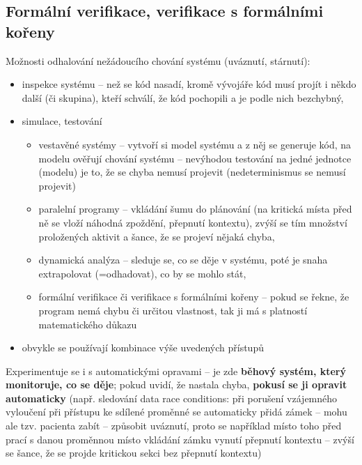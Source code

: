 \documentclass[a4paper, 11pt]{article}
\begin{document}
\subsection{Formální verifikace, verifikace s formálními kořeny}
Možnosti odhalování nežádoucího chování systému (uváznutí, stárnutí):
\begin{itemize}
    \item inspekce systému -- než se kód nasadí, kromě vývojáře kód musí projít i někdo další (či skupina), kteří schválí, že kód pochopili a je podle nich bezchybný,
    \item simulace, testování
    \begin{itemize}
        \item vestavěné systémy -- vytvoří si model systému a z něj se generuje kód, na modelu ověřují chování systému -- nevýhodou testování na jedné jednotce (modelu) je to, že se chyba nemusí projevit (nedeterminismus se nemusí projevit)
        
        \item paralelní programy -- vkládání šumu do plánování (na kritická místa před ně se vloží náhodná zpoždění, přepnutí kontextu), zvýší se tím množství proložených aktivit a šance, že se projeví nějaká chyba,
        
        \item dynamická analýza -- sleduje se, co se děje v systému, poté je snaha extrapolovat (=odhadovat), co by se mohlo stát,
        
        \item formální verifikace či verifikace s formálními kořeny -- pokud se řekne, že program nemá chybu či určitou vlastnost, tak ji má s platností matematického důkazu
    \end{itemize}
    
    \item obvykle se používají kombinace výše uvedených přístupů
\end{itemize}
 
Experimentuje se i s automatickými opravami -- je zde \textbf{běhový systém, který monitoruje, co se děje}; pokud uvidí, že nastala chyba, \textbf{pokusí se ji opravit automaticky} (např. sledování data race conditions: při porušení vzájemného vyloučení při přístupu ke sdílené proměnné se automaticky přidá zámek -- mohu ale tzv. pacienta zabít -- způsobit uváznutí, proto se například místo toho před prací s danou proměnnou místo vkládání zámku vynutí přepnutí kontextu -- zvýší se šance, že se projde kritickou sekci bez přepnutí kontextu)
\end{document}

